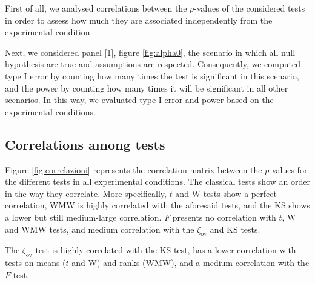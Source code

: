 \documentclass[twocolumn]{article}\usepackage[]{graphicx}\usepackage[]{xcolor}
\begin{document}
First of all, we analysed correlations between the $p$-values of the considered tests in order to assess how much they are associated independently from the experimental condition.

Next, we considered panel [1], figure \ref{fig:alpha0}, the scenario in which all null hypothesis are true and assumptions are respected. Consequently, we computed type I error by counting how many times the test is significant in this scenario, and the power by counting how many times it will be significant in all other scenarios. In this way, we evaluated type I error and power based on the experimental conditions.


\subsection{Correlations among tests}

Figure \ref{fig:correlazioni} represents the correlation matrix between the $p$-values for the different tests in all experimental conditions. The classical tests show an order in the way they correlate. More specifically, $t$ and W tests show a perfect correlation, WMW is highly correlated with the aforesaid tests, and the KS shows a lower but still medium-large correlation. $F$ presents no correlation with $t$, W and WMW tests, and medium correlation with the $\zeta_{\mbox{ov}}$ and KS tests. 

The $\zeta_{\mbox{ov}}$ test is highly correlated with the KS test, has a lower correlation with tests on means ($t$ and W) and ranks (WMW), and a medium correlation with the $F$ test.
\end{document}
